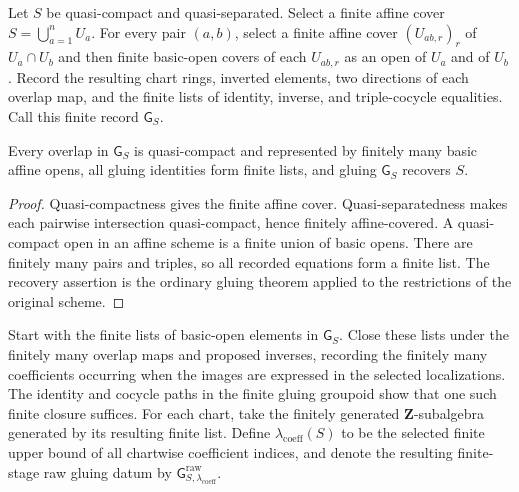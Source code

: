\begin{definition}
  \label{def:nagata-finite-affine-gluing-presentation}

  Let $S$ be quasi-compact and quasi-separated.  Select a finite affine cover
  $S=\bigcup_{a=1}^nU_a$.  For every pair $(a,b)$, select a finite affine
  cover $(U_{ab,r})_r$ of $U_a\cap U_b$ and then finite basic-open covers of
  each $U_{ab,r}$ as an open of $U_a$ and of $U_b$.  Record the resulting
  chart rings, inverted elements, two directions of each overlap map, and the
  finite lists of identity, inverse, and triple-cocycle equalities.  Call this
  finite record $\mathsf G_S$.
\end{definition}

\begin{lemma}
  \label{lemma:nagata-finite-affine-gluing-presentation}

  Every overlap in $\mathsf G_S$ is quasi-compact and represented by finitely
  many basic affine opens, all gluing identities form finite lists, and
  gluing $\mathsf G_S$ recovers $S$.
\end{lemma}

\begin{proof}
  Quasi-compactness gives the finite affine cover.  Quasi-separatedness makes
  each pairwise intersection quasi-compact, hence finitely affine-covered.
  A quasi-compact open in an affine scheme is a finite union of basic opens.
  There are finitely many pairs and triples, so all recorded equations form a
  finite list.  The recovery assertion is the ordinary gluing theorem applied
  to the restrictions of the original scheme.
\end{proof}

\begin{definition}
  \label{def:nagata-affine-gluing-coefficient-stage}

  Start with the finite lists of basic-open elements in $\mathsf G_S$.
  Close these lists under the finitely many overlap maps and proposed
  inverses, recording the finitely many coefficients occurring when the
  images are expressed in the selected localizations.  The identity and
  cocycle paths in the finite gluing groupoid show that one such finite
  closure suffices.  For each chart, take the finitely generated
  $\mathbf Z$-subalgebra generated by its resulting finite list.  Define
  $\lambda_{\mathrm{coeff}}(S)$ to be the selected finite upper bound of all
  chartwise coefficient indices, and denote the resulting finite-stage raw
  gluing datum by
  $\mathsf G_{S,\lambda_{\mathrm{coeff}}}^{\mathrm{raw}}$.
\end{definition}

